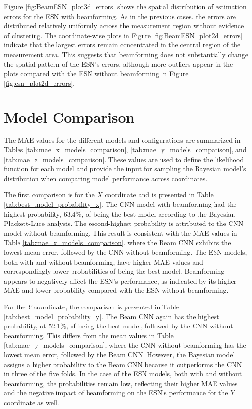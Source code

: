 Figure \ref{fig:BeamESN_plot3d_errors} shows the spatial distribution of estimation errors for the ESN with beamforming. As in the previous cases, the errors are distributed relatively uniformly across the measurement region without evidence of clustering. The coordinate-wise plots in Figure \ref{fig:BeamESN_plot2d_errors} indicate that the largest errors remain concentrated in the central region of the measurement area. This suggests that beamforming does not substantially change the spatial pattern of the ESN's errors, although more outliers appear in the plots compared with the ESN without beamforming in Figure \ref{fig:esn_plot2d_errors}.

\section{Model Comparison}

The MAE values for the different models and configurations are summarized in Tables \ref{tab:mae_x_models_comparison}, \ref{tab:mae_y_models_comparison}, and \ref{tab:mae_z_models_comparison}. These values are used to define the likelihood function for each model and provide the input for sampling the Bayesian model's distribution when comparing model performance across coordinates.

The first comparison is for the $X$ coordinate and is presented in Table \ref{tab:best_model_probability_x}. The CNN model with beamforming had the highest probability, 63.4\%, of being the best model according to the Bayesian Plackett-Luce analysis. The second-highest probability is attributed to the CNN model without beamforming. This result is consistent with the MAE values in Table \ref{tab:mae_x_models_comparison}, where the Beam CNN exhibits the lowest mean error, followed by the CNN without beamforming. The ESN models, both with and without beamforming, have higher MAE values and correspondingly lower probabilities of being the best model. Beamforming appears to negatively affect the ESN's performance, as indicated by its higher MAE and lower probability compared with the ESN without beamforming.

For the $Y$ coordinate, the comparison is presented in Table \ref{tab:best_model_probability_y}. The Beam CNN again has the highest probability, at 52.1\%, of being the best model, followed by the CNN without beamforming. This differs from the mean values in Table \ref{tab:mae_y_models_comparison}, where the CNN without beamforming has the lowest mean error, followed by the Beam CNN. However, the Bayesian model assigns a higher probability to the Beam CNN because it outperforms the CNN in three of the five folds. In the case of the ESN models, both with and without beamforming, the probabilities remain low, reflecting their higher MAE values and the negative impact of beamforming on the ESN's performance for the $Y$ coordinate as well.

